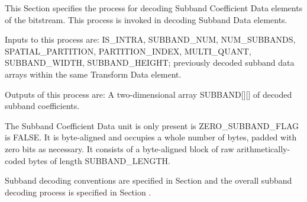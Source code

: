 This Section specifies the process for decoding Subband Coefficient Data
elements of the bitstream. This process is invoked in decoding Subband
Data elements.

Inputs to this process are: IS\_INTRA, SUBBAND\_NUM, NUM\_SUBBANDS,
SPATIAL\_PARTITION, PARTITION\_INDEX, MULTI\_QUANT, SUBBAND\_WIDTH,
SUBBAND\_HEIGHT; previously decoded subband data arrays within the same
Transform Data element.

Outputs of this process are: A two-dimensional array SUBBAND[][] of
decoded subband coefficients.

 The Subband Coefficient Data unit is only present is ZERO\_SUBBAND\_FLAG is
FALSE. It is byte-aligned and occupies a whole number of bytes, padded
with zero bits as necessary. It consists of a byte-aligned block of raw
arithmetically-coded bytes of length SUBBAND\_LENGTH.

Subband decoding conventions are specified in Section  and the overall
subband decoding process is specified in Section .


